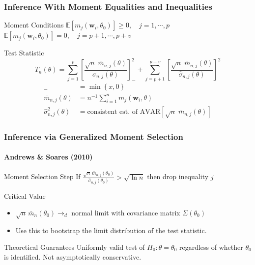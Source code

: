\documentclass{beamer}
\begin{document}
\begin{frame}
  \frametitle{Inference With Moment Equalities and Inequalities}
  \small

\begin{block}{Moment Conditions}
  $\mathbb{E} \left[ m_j(\mathbf{w}_i,\theta_0) \right] \geq 0, \quad j = 1, \cdots, p$\\
  $\mathbb{E} \left[ m_j(\mathbf{w}_i,\theta_0) \right]  = 0, \quad j = p+1, \cdots, p + v$
\end{block}


\begin{block}{Test Statistic}
  \vspace{-1em}
\[
  T_n(\theta) = \sum_{j=1}^p \left[\frac{\sqrt{n}\; \bar{m}_{n,j}(\theta)}{\widehat{\sigma}_{n,j}(\theta)}\right]^2_- + \sum_{j=p+1}^{p+v} \left[\frac{\sqrt{n}\; \bar{m}_{n,j}(\theta)}{\widehat{\sigma}_{n,j}(\theta)}\right]^2
\]
\footnotesize
\begin{align*}
[x]_- &= \min\left\{ x, 0 \right\}\\
\bar{m}_{n,j}(\theta) &= n^{-1} \sum_{i=1}^{n} m_j(\mathbf{w}_i, \theta)\\
\widehat{\sigma}^2_{n,j}(\theta) &=  \mbox{consistent est.\ of } \mbox{AVAR}\left[  \sqrt{n}\; \bar{m}_{n,j}(\theta)\right]
\end{align*}
\end{block}

\end{frame}
\begin{frame}
  \frametitle{Inference via Generalized Moment Selection}
  \framesubtitle{Andrews \& Soares (2010)}

  \begin{block}{Moment Selection Step}
    If $\displaystyle\frac{\sqrt{n}\,\bar{m}_{n,j}(\theta_0)}{\widehat{\sigma}_{n,j}(\theta_0)} > \sqrt{\ln n}$ then drop inequality $j$
  \end{block}

  \begin{block}{Critical Value} 
    \begin{itemize}
      \item $\sqrt{n}\, \bar{m}_n(\theta_0) \rightarrow_d$ normal limit with covariance matrix $\Sigma(\theta_0)$
      \item Use this to bootstrap the limit distribution of the test statistic.
    \end{itemize}
  \end{block}

  \begin{block}{Theoretical Guarantees}
    Uniformly valid test of $H_0\colon \theta = \theta_0$ \alert{regardless of whether $\theta_0$ is identified}.
    Not asymptotically conservative.
  \end{block}

\end{frame}
\end{document}
